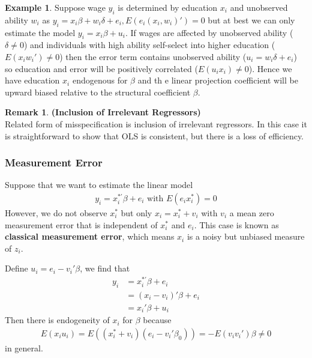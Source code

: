 \documentclass[11pt]{article} %
\theoremstyle{definition}
\numberwithin{defn}{subsection}
\numberwithin{thm}{subsection}
\newtheorem*{rmk}{Remark}
\newtheorem{ex}{Example}
\numberwithin{ex}{subsection}
\begin{document}
\begin{ex}\label{ex:ovbexample}
	Suppose wage $y_i$ is determined by education $x_i$ and unobserved ability $w_i$ as $y_i=x_i\beta+w_i\delta+e_i,E(e_i(x_i,w_i)')=0$ but at best we can only estimate the model $y_i=x_i\beta+u_i$. If wages are affected by unobserved ability ($\delta\neq0$) and individuals with high ability self-select into higher education ($E(x_iw_i')\neq0$) then the error term contains unobserved ability ($u_i=w_i\delta+e_i$) so education and error will be positively correlated ($E(u_ix_i)\neq0$). Hence we have education $x_i$ endogenous for $\beta$ and th e linear projection coefficient will be upward biased relative to the structural coefficient $\beta$.
\end{ex}

\begin{rmk}
	\textbf{(Inclusion of Irrelevant Regressors)}\\Related form of misspecification is inclusion of irrelevant regressors. In this case it is straightforward to show that OLS is consistent, but there is a loss of efficiency. 
\end{rmk}

\subsubsection{Measurement Error}
Suppose that we want to estimate the linear model
\begin{align*}
y_i=x_i^{*\prime}\beta+e_i\text{ with }E(e_i x_i^*)=0
\end{align*}
However, we do not observe $x_i^*$ but only $x_i=x_i^*+v_i$ with $v_i$ a mean zero measurement error that is independent of $x_i^*$ and $e_i$. This case is known as \textbf{classical measurement error}, which means $x_i$ is a noisy but unbiased measure of $z_i$.

Define $u_i=e_i-v_i'\beta$, we find that
\begin{align*}
y_i&=x_i^{*\prime}\beta+e_i\\
&=(x_i-v_i)'\beta+e_i\\
&=x_i'\beta+u_i
\end{align*}
Then there is endogeneity of $x_i$ for $\beta$ because
\begin{align*}
E(x_iu_i)=E((x_i^*+v_i)(e_i-v_i'\beta_0))=-E(v_iv_i')\beta\neq 0
\end{align*}
in general.
\end{document}
